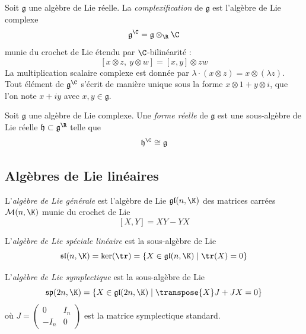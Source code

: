 \begin{definition}
    Soit $\mathfrak{g}$ une algèbre de Lie réelle. La \emph{complexification} de $\mathfrak{g}$ est l'algèbre de Lie complexe
    $$\mathfrak{g}^{\C} = \mathfrak{g} \otimes_{\R} \C$$
    munie du crochet de Lie étendu par $\C$-bilinéarité :
    $$[x \otimes z,\ y \otimes w] = [x, y] \otimes zw$$
    La multiplication scalaire complexe est donnée par $\lambda \cdot (x \otimes z) = x \otimes (\lambda z)$. Tout élément de $\mathfrak{g}^{\C}$ s'écrit de manière unique sous la forme $x \otimes 1 + y \otimes i$, que l'on note $x + iy$ avec $x, y \in \mathfrak{g}$.
\end{definition}

\begin{definition}
    Soit $\mathfrak{g}$ une algèbre de Lie complexe. Une \emph{forme réelle} de $\mathfrak{g}$ est une sous-algèbre de Lie réelle $\mathfrak{h} \subset \mathfrak{g}^{\R}$ telle que
    $$\mathfrak{h}^{\C} \cong \mathfrak{g}$$
\end{definition}

\subsection{Algèbres de Lie linéaires}

\begin{definition}
    L'\emph{algèbre de Lie générale} est l'algèbre de Lie $\mathfrak{gl}(n, \K)$ des matrices carrées $\mathcal{M}(n, \K)$ munie du crochet de Lie
    $$[X, Y] = XY - YX$$
\end{definition}

\begin{definition}
    L'\emph{algèbre de Lie spéciale linéaire} est la sous-algèbre de Lie
    $$\mathfrak{sl}(n, \K) = \ker(\tr) = \{ X \in \mathfrak{gl}(n, \K) \mid \tr(X) = 0 \}$$
\end{definition}

\begin{definition}
    L'\emph{algèbre de Lie symplectique} est la sous-algèbre de Lie
    $$\mathfrak{sp}(2n, \K) = \left\{ X \in \mathfrak{gl}(2n, \K) \mid \transpose{X} J + J X = 0 \right\}$$
    où $J = \begin{pmatrix} 0 & I_n \\ -I_n & 0 \end{pmatrix}$ est la matrice symplectique standard.
\end{definition}

